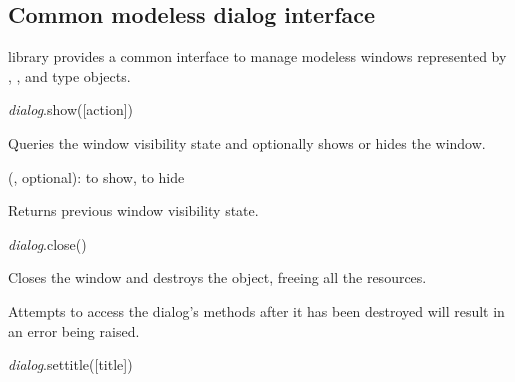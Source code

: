 \documentclass[a4paper,12pt,twoside,extrafontsizes]{memoir}
\begin{document}
\subsection{Common modeless dialog interface}
\label{subsec:luamodelessdialog}

\begin{funcdescr}
	 library provides a common interface to manage modeless windows represented by , ,  and  type objects.
\end{funcdescr}


\begin{luafuncprototype}
\emph{dialog}.show([action])
\end{luafuncprototype}

\begin{funcdescr}
	Queries the window visibility state and optionally shows or hides the window.
\end{funcdescr}

\begin{funcparams}
	 (, optional):  to show,  to hide
\end{funcparams}

\begin{funcret}
	Returns previous window visibility state.
\end{funcret}


\begin{luafuncprototype}
\emph{dialog}.close()
\end{luafuncprototype}

\begin{funcdescr}
	Closes the window and destroys the object, freeing all the resources.
\end{funcdescr}

\begin{funcremarks}
	Attempts to access the dialog's methods after it has been destroyed will result in an error being raised.
\end{funcremarks}


\begin{luafuncprototype}
\emph{dialog}.settitle([title])
\end{luafuncprototype}
\end{document}
